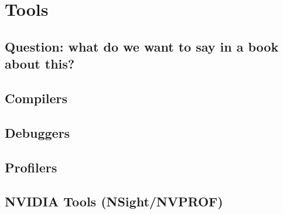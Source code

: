 

\chapter{Tools}
\section{Question: what do we want to say in a book about this?}
\section{Compilers}
\section{Debuggers}
\section{Profilers}
\section{NVIDIA Tools (NSight/NVPROF)}
